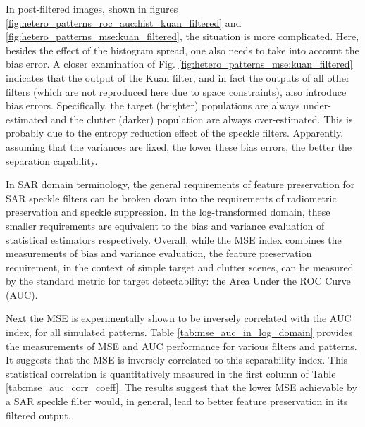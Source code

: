 In post-filtered images, shown in figures \ref{fig:hetero_patterns_roc_auc:hist_kuan_filtered} and 
\ref{fig:hetero_patterns_mse:kuan_filtered}, the situation is more complicated.
Here, besides the effect of the histogram spread, one also needs to take into account the bias error.
A closer examination of Fig. \ref{fig:hetero_patterns_mse:kuan_filtered} indicates that the output of the 
Kuan filter, and in fact the outputs of all other filters (which are not reproduced here due to space constraints), 
also introduce bias errors.
Specifically, the target (brighter) populations are always under-estimated and the clutter (darker) population are 
always over-estimated. This is probably due to the entropy reduction effect of the speckle filters.
Apparently, assuming that the variances are fixed, the lower these bias errors, the better the separation capability.

In SAR domain terminology, the general requirements of feature preservation for SAR speckle filters can be broken 
down into the requirements of radiometric preservation and speckle suppression.
In the log-transformed domain, these smaller requirements are equivalent to the bias and variance evaluation of 
statistical estimators respectively.
Overall, while the MSE index combines the measurements of bias and variance evaluation, 
	the feature preservation requirement, in the context of simple target and clutter scenes, can be measured by 
	the standard metric for target detectability: the Area Under the ROC Curve (AUC).
        
Next the MSE is experimentally shown to be inversely correlated with the AUC index, for all simulated patterns.
Table \ref{tab:mse_auc_in_log_domain} provides the measurements of MSE and AUC performance for various filters and 
patterns.
It suggests that the MSE is inversely correlated to this separability index.
This statistical correlation is quantitatively measured in the first column of Table \ref{tab:mse_auc_corr_coeff}.
The results suggest that the lower MSE achievable by a SAR speckle filter would, in general, lead to better feature preservation in its filtered output.

